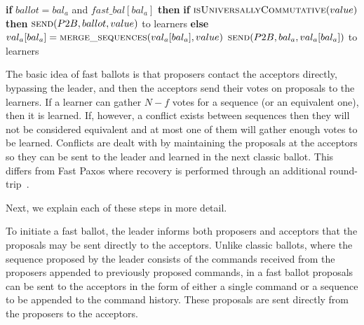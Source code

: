 \begin{algorithm}
\begin{algorithmic}[1]
		\State
		\State \textbf{if} $ballot = bal_a$ and $fast\_bal[bal_a]$ \textbf{then}
		\State \hspace{\algorithmicindent} \textbf{if} $\Call{isUniversallyCommutative}{value}$ \textbf{then}
		\State \hspace{\algorithmicindent}\hspace{\algorithmicindent} $\Call{send}{P2B, ballot, value}$ to learners
		\State \hspace{\algorithmicindent}\textbf{else}
		\State \hspace{\algorithmicindent}\hspace{\algorithmicindent} $val_a[bal_a] =  \Call{merge\_sequences}{val_a[bal_a], value}$
		\State \hspace{\algorithmicindent}\hspace{\algorithmicindent} $\Call{send}{P2B, bal_a, val_a[bal_a]}$ to learners
		\EndFunction
	\end{algorithmic}
\end{algorithm}

The basic idea of fast ballots is that proposers contact the acceptors directly, bypassing the leader, and then the acceptors send their votes on proposals to the learners. If a learner can gather $N-f$ votes for a sequence (or an equivalent one), then it is learned. If, however, a conflict exists between sequences then they will not be considered equivalent and at most one of them will gather enough votes to be learned. Conflicts are dealt with by maintaining the proposals at the acceptors so they can be sent to the leader and learned in the next classic ballot. This differs from Fast Paxos where recovery is performed through an additional round-trip~\cite{L06}. \par
Next, we explain each of these steps in more detail.\par
{}
To initiate a fast ballot, the leader informs both proposers and acceptors that the proposals may be sent directly to the acceptors. Unlike classic ballots, where the sequence proposed by the leader consists of the commands received from the proposers appended to previously proposed commands, in a fast ballot proposals can be sent to the acceptors in the form of either a single command or a sequence to be appended to the command history. These proposals are sent directly from the proposers to the acceptors.\par

